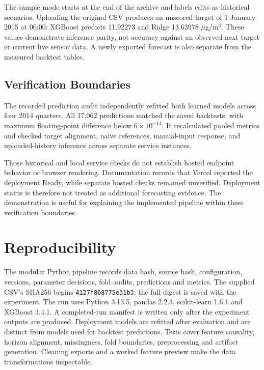 \documentclass[conference]{IEEEtran}
\begin{document}
The sample mode starts at the end of the archive and labels edits as historical scenarios. Uploading the original CSV produces an unscored target of 1 January 2015 at 00:00: XGBoost predicts 11.92273 and Ridge 13.63978 $\mu$g/m$^3$. These values demonstrate inference parity, not accuracy against an observed next target or current live sensor data. A newly exported forecast is also separate from the measured backtest tables.

\subsection{Verification Boundaries}
The recorded prediction audit independently refitted both learned models across four 2014 quarters. All 17,062 predictions matched the saved backtests, with maximum floating-point difference below $6\times10^{-14}$. It recalculated pooled metrics and checked target alignment, naive references, manual-input response, and uploaded-history inference across separate service instances.

Those historical and local service checks do not establish hosted endpoint behavior or browser rendering. Documentation records that Vercel reported the deployment Ready, while separate hosted checks remained unverified. Deployment status is therefore not treated as additional forecasting evidence. The demonstration is useful for explaining the implemented pipeline within these verification boundaries.

\section{Reproducibility}
The modular Python pipeline records data hash, source hash, configuration, versions, parameter decisions, fold audits, predictions and metrics. The supplied CSV's SHA256 begins \texttt{4127f868775e31b3}; the full digest is saved with the experiment. The run uses Python 3.13.5, pandas 2.2.3, scikit-learn 1.6.1 and XGBoost 3.4.1. A completed-run manifest is written only after the experiment outputs are produced. Deployment models are refitted after evaluation and are distinct from models used for backtest predictions. Tests cover feature causality, horizon alignment, missingness, fold boundaries, preprocessing and artifact generation. Cleaning exports and a worked feature preview make the data transformations inspectable.
\end{document}
